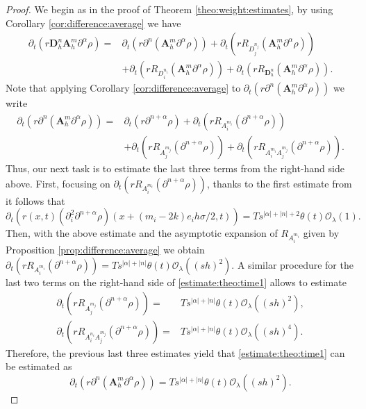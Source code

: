 \documentclass[11pt,oneside,leqno]{amsart}
\numberwithin{equation}{section}
\numberwithin{equation}{section}
\begin{document}
\begin{proof}
We begin as in the proof of Theorem \ref{theo:weight:estimates}, by using Corollary \ref{cor:difference:average} we have 
\begin{equation*}
\begin{aligned}
   \partial_{t}(r\mathbf{D}_{h}^{n}\mathbf{A}_{h}^{m}\partial^{\alpha}\rho)=&\partial_{t}(r\partial^{n}(\mathbf{A}_{h}^{m}\partial^{\alpha}\rho))+\partial_{t}(rR_{D^{n_{j}}_{j}}(\mathbf{A}_{h}^{m}\partial^{\alpha}\rho))\\
   &+\partial_{t}(rR_{D^{n_{i}}_{i}}(\mathbf{A}_{h}^{m}\partial^{\alpha}\rho))+\partial_{t}(rR_{\mathbf{D}_{h}^{n}}(\mathbf{A}_{h}^{m}\partial^{\alpha}\rho)).
   \end{aligned}
\end{equation*}
Note that applying Corollary \ref{cor:difference:average} to $\partial_{t}(r\partial^{n}(\mathbf{A}_{h}^{m}\partial^{\alpha}\rho))$ we write
\begin{equation}\label{estimate:theo:time1}
\begin{aligned}
    \partial_{t}(r\partial^{n}(\mathbf{A}_{h}^{m}\partial^{\alpha}\rho))=&\partial_{t}(r\partial^{n+\alpha}\rho)+\partial_{t}(rR_{A_{i}^{m_{i}}}(\partial^{n+\alpha}\rho))\\
    &+\partial_{t}(rR_{A_{j}^{m_{j}}}(\partial^{n+\alpha}\rho))+\partial_{t}(rR_{A_{i}^{m_{i}}A_{j}^{m_{j}}}(\partial^{n+\alpha}\rho)).
    \end{aligned}
\end{equation}
Thus, our next task is to estimate the last three terms from the right-hand side above. First, focusing on $\partial_{t}(rR_{A_{i}^{m_{i}}}(\partial^{n+\alpha}\rho))$, thanks to the first estimate from \cite[Proposition 2.14]{boyer-2014} it follows that
\begin{equation}\label{eq:coro:rho}
\partial_{t}(r(x,t)(\partial_{i}^{2}\partial^{n+\alpha}\rho)(x+(m_{i}-2k)e_{i}h\sigma/2,t))=Ts^{|\alpha|+|n|+2}\theta(t)\mathcal{O}_{\lambda}(1).
\end{equation}
Then, with the above estimate and the asymptotic expansion of $R_{A_{i}^{m_{i}}}$ given by Proposition \ref{prop:difference:average} we obtain $\partial_{t}(rR_{A_{i}^{m_{i}}}(\partial^{n+\alpha}\rho))=Ts^{|\alpha|+|n|
}\theta(t)\mathcal{O}_{\lambda}((sh)^{2})$. A similar procedure for the last two terms on the right-hand side of \eqref{estimate:theo:time1} allows to estimate
\begin{align*}
    \partial_{t}(rR_{A_{j}^{m_{j}}}(\partial^{n+\alpha}\rho))=&Ts^{|\alpha|+|n|
}\theta(t)\mathcal{O}_{\lambda}((sh)^{2}),\\
    \partial_{t}(rR_{A_{i}^{n_{i}}A_{j}^{m_{j}}}(\partial^{n+\alpha}\rho))=&Ts^{|\alpha|+|n|
}\theta(t)\mathcal{O}_{\lambda}((sh)^{4}).
\end{align*}
Therefore, the previous last three estimates yield that \eqref{estimate:theo:time1} can be estimated as 
\begin{equation*}
    \partial_{t}(r\partial^{n}(\mathbf{A}_{h}^{m}\partial^{\alpha}\rho))= Ts^{|\alpha|+|n|
}\theta(t)\mathcal{O}_{\lambda}((sh)^{2}).
\end{equation*}


\end{proof}
\end{document}
